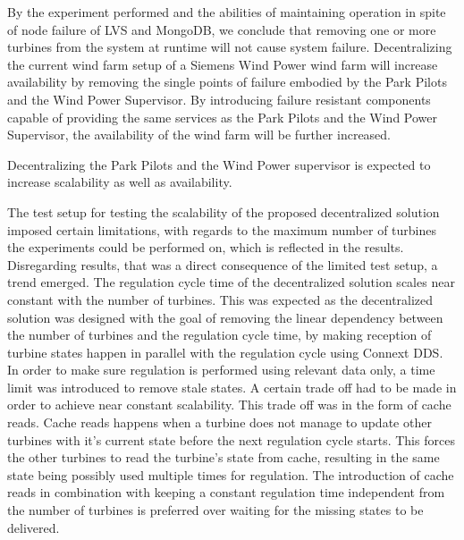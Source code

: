 By the experiment performed and the abilities of maintaining operation in spite of node failure of LVS and MongoDB, we conclude that removing one or more turbines from the system at runtime will not cause system failure. Decentralizing the current wind farm setup of a Siemens Wind Power wind farm will increase availability by removing the single points of failure embodied by the Park Pilots and the Wind Power Supervisor. By introducing failure resistant components capable of providing the same services as the Park Pilots and the Wind Power Supervisor, the availability of the wind farm will be further increased.

Decentralizing the Park Pilots and the Wind Power supervisor is expected to increase scalability as well as availability.

The test setup for testing the scalability of the proposed decentralized solution imposed certain limitations, with regards to the maximum number of turbines the experiments could be performed on, which is reflected in the results. Disregarding results, that was a direct consequence of the limited test setup, a trend emerged. The regulation cycle time of the decentralized solution scales near constant with the number of turbines. This was expected as the decentralized solution was designed with the goal of removing the linear dependency between the number of turbines and the regulation cycle time, by making reception of turbine states happen in parallel with the regulation cycle using Connext DDS. In order to make sure regulation is performed using relevant data only, a time limit was introduced to remove stale states. A certain trade off had to be made in order to achieve near constant scalability. This trade off was in the form of cache reads.
Cache reads happens when a turbine does not manage to update other turbines with it's current state before the next regulation cycle starts. This forces the other turbines to read the turbine's state from cache, resulting in the same state being possibly used multiple times for regulation. The introduction of cache reads in combination with keeping a constant regulation time independent from the number of turbines is preferred over waiting for the missing states to be delivered.

